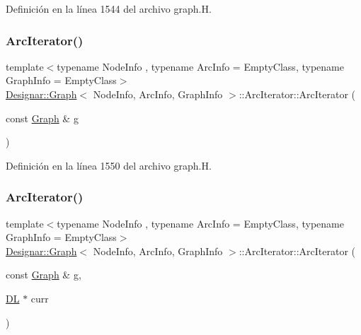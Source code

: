 Definición en la línea 1544 del archivo graph.\+H.

\mbox{\label{class_designar_1_1_graph_1_1_arc_iterator_afeb58fdc5c6d4fd2d57c2ce53969203e}} 
\subsubsection{\texorpdfstring{Arc\+Iterator()}{ArcIterator()}\hspace{0.1cm}{\footnotesize\ttfamily [2/5]}}
{\footnotesize\ttfamily template$<$typename Node\+Info , typename Arc\+Info  = Empty\+Class, typename Graph\+Info  = Empty\+Class$>$ \\
\hyperlink{class_designar_1_1_graph}{Designar\+::\+Graph}$<$ Node\+Info, Arc\+Info, Graph\+Info $>$\+::Arc\+Iterator\+::\+Arc\+Iterator (\begin{DoxyParamCaption}\item[{const \hyperlink{class_designar_1_1_graph}{Graph} \&}]{g }\end{DoxyParamCaption})\hspace{0.3cm}{\ttfamily [inline]}}



Definición en la línea 1550 del archivo graph.\+H.

\mbox{\label{class_designar_1_1_graph_1_1_arc_iterator_a2a9eb9d16ff5d80a22671dfdbe9ce3a2}} 
\subsubsection{\texorpdfstring{Arc\+Iterator()}{ArcIterator()}\hspace{0.1cm}{\footnotesize\ttfamily [3/5]}}
{\footnotesize\ttfamily template$<$typename Node\+Info , typename Arc\+Info  = Empty\+Class, typename Graph\+Info  = Empty\+Class$>$ \\
\hyperlink{class_designar_1_1_graph}{Designar\+::\+Graph}$<$ Node\+Info, Arc\+Info, Graph\+Info $>$\+::Arc\+Iterator\+::\+Arc\+Iterator (\begin{DoxyParamCaption}\item[{const \hyperlink{class_designar_1_1_graph}{Graph} \&}]{g,  }\item[{\hyperlink{class_designar_1_1_d_l}{DL} $\ast$}]{curr }\end{DoxyParamCaption})\hspace{0.3cm}{\ttfamily [inline]}}



